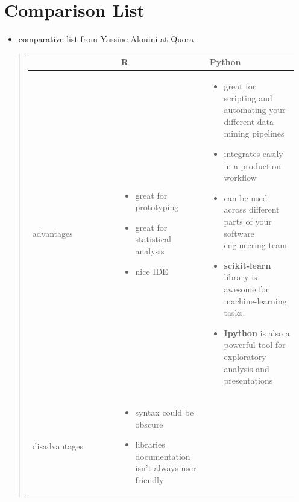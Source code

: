 \documentclass[letterpaper,11pt,english]{sphinxmanual}
\begin{document}
\section{Comparison List}
\label{comparison:comparison-list}\begin{itemize}
\item {} 
comparative list  from  \href{https://www.quora.com/profile/Yassine-Alouini}{Yassine Alouini} at \href{https://www.quora.com/Which-is-better-for-data-analysis-R-or-Python}{Quora}

\end{itemize}
\begin{quote}

\begin{tabular}{|p{0.317\linewidth}|p{0.317\linewidth}|p{0.317\linewidth}|}
\hline
 & 
\textbf{R}
 & 
\textbf{Python}
\\
\hline
advantages
 & \begin{itemize}
\item {} 
great for prototyping

\item {} 
great for statistical analysis

\item {} 
nice  IDE

\end{itemize}
 & \begin{itemize}
\item {} 
great for scripting and automating your different data mining pipelines

\item {} 
integrates easily in a production workflow

\item {} 
can be used across different parts of your software engineering team

\item {} 
\textbf{scikit-learn} library is awesome for machine-learning tasks.

\item {} 
\textbf{Ipython} is also a powerful tool for exploratory analysis and presentations

\end{itemize}
\\
\hline
disadvantages
 & \begin{itemize}
\item {} 
syntax could be obscure

\item {} 
libraries documentation isn't always user friendly


\end{itemize}
\end{tabular}
\end{quote}
\end{document}
